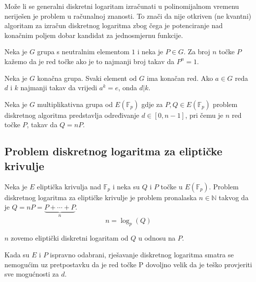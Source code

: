 \documentclass{mathos}
\begin{document}
Može li se generalni diskretni logaritam izračunati u polinomijalnom vremenu neriješen je problem u računalnoj znanosti. To znači da nije otkriven (ne kvantni) algoritam za izračun diskretnog logaritma zbog čega je potenciranje nad konačnim poljem dobar kandidat za jednosmjernu funkcije.

\begin{defin}
    Neka je $G$ grupa s neutralnim elementom $1$ i neka je $P\in G$. Za broj $n$ točke $P$ kažemo da je red točke ako je to najmanji broj takav da $P^n = 1$.
\end{defin}

\begin{propozicija}
    \label{reddjeljiv}
    Neka je $G$ konačna grupa. Svaki element od $G$ ima konačan red. Ako $a \in G$ reda $d$ i $k$ najmanji takav da vrijedi $a^k = e$, onda $d | k$.
\end{propozicija}

\begin{primjer}
    Neka je $G$ multiplikativna grupa od $E(\mathbb{F}_p)$ gdje za $P, Q\in E(\mathbb{F}_p)$ problem diskretnog algoritma predstavlja određivanje $d\in [0, n-1]$, pri čemu je $n$ red točke $P$, takav da $Q = nP$.
\end{primjer}

\subsection{Problem diskretnog logaritma za eliptičke krivulje}
\begin{defin}[ECDLP]
    Neka je $E$ eliptička krivulja nad $\mathbb{F}_p$ i neka su $Q$ i $P$ točke u $E(\mathbb{F}_p)$. Problem diskretnog logaritma za eliptičke krivulje je problem pronalaska $n \in \mathbb{N}$ takvog da je $Q = nP = \underbrace{P + \cdots + P}_{n}$.
    \[ n = \log_p(Q) \]
\end{defin}

\begin{nap}
    $n$ zovemo eliptički diskretni logaritam od $Q$ u odnosu na $P$.
\end{nap}

Kada su $E$ i $P$ ispravno odabrani, rješavanje diskretnog logaritma smatra se nemogućim uz pretpostavku da je red točke P dovoljno velik da je teško provjeriti sve mogućnosti za $d$.
\end{document}
